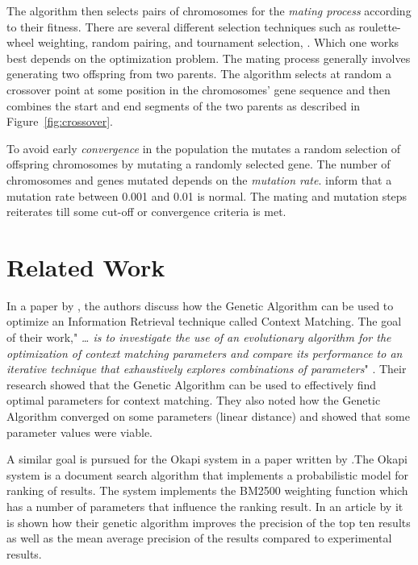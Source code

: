 The algorithm then selects pairs of chromosomes for the \textit{mating process} according to their fitness. There are several different selection techniques such as roulette-wheel weighting, random pairing, and tournament selection, \cite{Haupt2004a}. Which one works best depends on the optimization problem. The mating process generally involves generating two offspring from two parents. The algorithm selects at random a crossover point at some position in the chromosomes' gene sequence and then combines the start and end segments of the two parents as described in Figure~\ref{fig:crossover}.

To avoid early \textit{convergence} in the population the \GA mutates a random selection of offspring chromosomes by mutating a randomly selected gene. The number of chromosomes and genes mutated depends on the \textit{mutation rate}. \cite{Goldberg1989,Negnevitsky2002} inform that a mutation rate between 0.001 and 0.01 is normal. The mating and mutation steps reiterates till some cut-off or convergence criteria is met.

\section{Related Work}
\label{RelatedWork}
In  a paper by \citeauthor{Zakos2005}, the authors discuss how the Genetic Algorithm can be used to optimize an Information Retrieval technique called Context Matching. The goal of their work," \textit{{\dots} is to investigate the use of an evolutionary algorithm for the optimization of context matching parameters and compare its performance to an iterative technique that exhaustively explores combinations of parameters}" \cite[582]{Zakos2005}. Their research showed that the Genetic Algorithm can be used to effectively find optimal parameters for context matching. They also noted how the Genetic Algorithm converged on some parameters (linear distance) and showed that some parameter values were viable.

A similar goal is pursued for the Okapi system in a paper written by \cite{Chuan2003}.The Okapi system is a document search algorithm that implements a probabilistic model for ranking of results. The system implements the BM2500 weighting function which has a number of parameters that influence the ranking result. In an article by \cite{Chuan2003} it is shown how their genetic algorithm improves the precision of the top ten results as well as the mean average precision of the results compared to experimental results.

